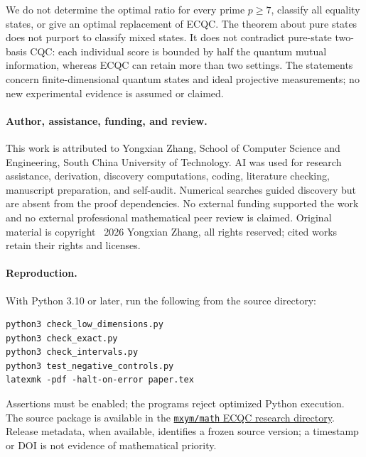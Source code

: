 \documentclass[11pt]{article}
\theoremstyle{remark}
\begin{document}
We do not determine the optimal ratio for every prime $p\geq7$, classify all equality states, or give an optimal replacement of ECQC. The theorem about pure states does not purport to classify mixed states. It does not contradict pure-state two-basis CQC: each individual score is bounded by half the quantum mutual information, whereas ECQC can retain more than two settings. The statements concern finite-dimensional quantum states and ideal projective measurements; no new experimental evidence is assumed or claimed.

\paragraph{Author, assistance, funding, and review.}
This work is attributed to Yongxian Zhang, School of Computer Science and Engineering, South China University of Technology. AI was used for research assistance, derivation, discovery computations, coding, literature checking, manuscript preparation, and self-audit. Numerical searches guided discovery but are absent from the proof dependencies. No external funding supported the work and no external professional mathematical peer review is claimed. Original material is copyright \textcopyright\ 2026 Yongxian Zhang, all rights reserved; cited works retain their rights and licenses.

\paragraph{Reproduction.}
With Python 3.10 or later, run the following from the source directory:
\begin{verbatim}
python3 check_low_dimensions.py
python3 check_exact.py
python3 check_intervals.py
python3 test_negative_controls.py
latexmk -pdf -halt-on-error paper.tex
\end{verbatim}
Assertions must be enabled; the programs reject optimized Python execution.
The source package is available in the
\href{https://github.com/mxym/math/tree/main/research/ecqc-pure-state-counterexamples}{\texttt{mxym/math} ECQC research directory}.
Release metadata, when available, identifies a frozen source version; a timestamp or DOI is not evidence of mathematical priority.
\end{document}
